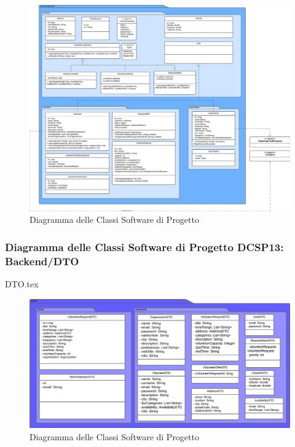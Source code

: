\documentclass[12pt]{article}
\begin{document}
\begin{figure}[H]
    \includegraphics[width=\textwidth, height=\textheight,keepaspectratio]{Immagini/DCSP/Iterazione 2/Backend/DCSPDomain.png}
        \caption{Diagramma delle Classi Software di Progetto}
        \label{fig:diagrammaDCSP12}
\end{figure}

\subsubsection{Diagramma delle Classi Software di Progetto DCSP13: Backend/DTO}
{DTO.tex}

\begin{figure}[H]
    \includegraphics[width=\textwidth, height=\textheight,keepaspectratio]{Immagini/DCSP/Iterazione 2/Backend/DCSPDTO.png}
        \caption{Diagramma delle Classi Software di Progetto}
        \label{fig:diagrammaDCSP13}
\end{figure}
\end{document}
